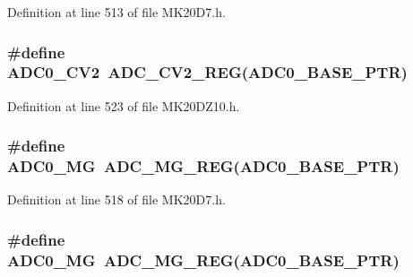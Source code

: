 Definition at line 513 of file M\+K20\+D7.\+h.

\subsubsection[{\texorpdfstring{A\+D\+C0\+\_\+\+C\+V2}{ADC0_CV2}}]{\setlength{\rightskip}{0pt plus 5cm}\#define A\+D\+C0\+\_\+\+C\+V2~{\bf A\+D\+C\+\_\+\+C\+V2\+\_\+\+R\+EG}({\bf A\+D\+C0\+\_\+\+B\+A\+S\+E\+\_\+\+P\+TR})}\hypertarget{group___a_d_c___register___accessor___macros_ga6625abe45d9bef5adac93e647cd034c3}{}\label{group___a_d_c___register___accessor___macros_ga6625abe45d9bef5adac93e647cd034c3}


Definition at line 523 of file M\+K20\+D\+Z10.\+h.

\subsubsection[{\texorpdfstring{A\+D\+C0\+\_\+\+MG}{ADC0_MG}}]{\setlength{\rightskip}{0pt plus 5cm}\#define A\+D\+C0\+\_\+\+MG~{\bf A\+D\+C\+\_\+\+M\+G\+\_\+\+R\+EG}({\bf A\+D\+C0\+\_\+\+B\+A\+S\+E\+\_\+\+P\+TR})}\hypertarget{group___a_d_c___register___accessor___macros_gac3baf0b5cfa0509588527436dc8bf209}{}\label{group___a_d_c___register___accessor___macros_gac3baf0b5cfa0509588527436dc8bf209}


Definition at line 518 of file M\+K20\+D7.\+h.

\subsubsection[{\texorpdfstring{A\+D\+C0\+\_\+\+MG}{ADC0_MG}}]{\setlength{\rightskip}{0pt plus 5cm}\#define A\+D\+C0\+\_\+\+MG~{\bf A\+D\+C\+\_\+\+M\+G\+\_\+\+R\+EG}({\bf A\+D\+C0\+\_\+\+B\+A\+S\+E\+\_\+\+P\+TR})}\hypertarget{group___a_d_c___register___accessor___macros_gac3baf0b5cfa0509588527436dc8bf209}{}\label{group___a_d_c___register___accessor___macros_gac3baf0b5cfa0509588527436dc8bf209}



